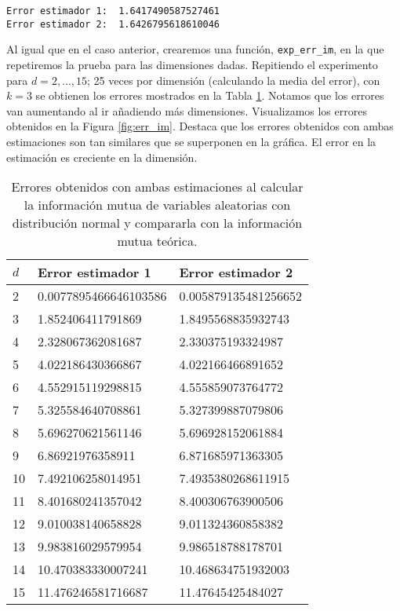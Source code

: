 \documentclass[12pt,a4paper]{report} %
\theoremstyle{definition}
\begin{document}
\begin{lstlisting}
Error estimador 1:  1.6417490587527461
Error estimador 2:  1.6426795618610046

\end{lstlisting}

Al igual que en el caso anterior, crearemos una función, \texttt{exp\_err\_im}, en la que repetiremos la prueba para las dimensiones dadas. Repitiendo el experimento para $d=2,...,15$; 25 veces por dimensión (calculando la media del error), con $k=3$ se obtienen los errores mostrados en la Tabla \ref{tab:err_im}. Notamos que los errores van aumentando al ir añadiendo más dimensiones. Visualizamos los errores obtenidos en la Figura \ref{fig:err_im}. Destaca que los errores obtenidos con ambas estimaciones son tan similares que se superponen en la gráfica. El error en la estimación es creciente en la dimensión.\\

\begin{table}[H]
\centering
\caption{Errores obtenidos con ambas estimaciones al calcular la información mutua de variables aleatorias con distribución normal y compararla con la información mutua teórica.}
\label{tab:err_im}
\begin{tabular}{lll}
\toprule
$d$ & Error estimador 1 & Error estimador 2\\ \midrule
2 & 0.0077895466646103586 & 0.005879135481256652\\
3 & 1.852406411791869 & 1.8495568835932743\\
4 & 2.328067362081687 & 2.330375193324987\\
5 & 4.022186430366867 & 4.022166466891652\\
6 & 4.552915119298815 & 4.555859073764772\\
7 & 5.325584640708861 & 5.327399887079806\\
8 & 5.696270621561146 & 5.696928152061884\\
9 & 6.86921976358911 & 6.871685971363305\\
10 & 7.492106258014951 & 7.4935380268611915\\
11 & 8.401680241357042 & 8.400306763900506\\
12 & 9.010038140658828 & 9.011324360858382\\
13 & 9.983816029579954 & 9.986518788178701\\
14 & 10.470383330007241 & 10.468634751932003\\
15 & 11.476246581716687 & 11.47645425484027\\
\bottomrule
\end{tabular}
\end{table}
\end{document}
